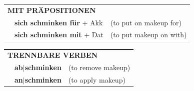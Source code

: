 \documentclass[10pt,a4paper]{revtex4-2}
\begin{document}
\begin{verbbox}
\vspace{10pt}

\begin{tabular}{lll}
\multicolumn{3}{l}{\textbf{MIT PRÄPOSITIONEN}}\\
& \textbf{sich schminken für} + Akk & (to put on makeup for)\\
& \textbf{sich schminken mit} + Dat & (to put makeup on with)\\
\end{tabular}
\hfill
\begin{tabular}{lll}
\multicolumn{3}{l}{\textbf{TRENNBARE VERBEN}}\\
& \textbf{ab$|$schminken} & (to remove makeup)\\
& \textbf{an$|$schminken} & (to apply makeup)\\
\end{tabular}
\vspace{-5pt}
\end{verbbox}
\end{document}
